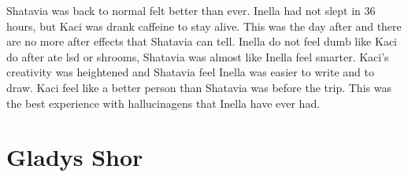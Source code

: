 \documentclass[12pt]{book}
\begin{document}
Shatavia was back to normal felt better than ever. Inella had not slept in 36 hours, but Kaci was drank caffeine to stay alive. This was the day after and there are no more after effects that Shatavia can tell. Inella do not feel dumb like Kaci do after ate lsd or shrooms, Shatavia was almost like Inella feel smarter. Kaci's creativity was heightened and Shatavia feel Inella was easier to write and to draw. Kaci feel like a better person than Shatavia was before the trip. This was the best experience with hallucinagens that Inella have ever had.






\chapter{Gladys Shor}
\end{document}
